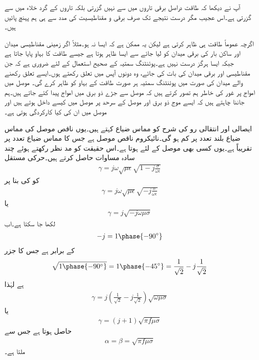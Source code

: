آپ نے دیکھا کہ طاقت دراصل برقی تاروں میں سے نہیں گزرتی بلکہ تاروں کے گرد خلاء میں سے گزرتی ہے۔اس عجیب مگر درست نتیجے تک صرف برقی و مقناطیسیت کی مدد سے ہی ہم پہنچ پائیں ہیں۔ 

اگرچہ  عموماً طاقت ہی ظاہر کرتی ہے لیکن یہ ممکن ہے کہ ایسا نہ ہو۔مثلاً اگر زمینی مقناطیسی میدان  اور ساکن بار کی برقی میدان  کو لیا جائے  سے ایسا ظاہر ہوتا ہے جیسے طاقت کا بہاو پایا جاتا ہے جبکہ ایسا ہرگز درست نہیں ہے۔پوئنٹنگ سمتیہ کے صحیح استعمال کے لئے ضروری ہے کہ جن مقناطیسی اور برقی میدان کی بات کی جائے، وہ دونوں آپس میں تعلق رکھتے ہوں۔ایسے تعلق رکھنے والے میدان کی صورت میں پوئنٹنگ  سمتیہ ہر صورت طاقت کے بہاو کو ظاہر کرے گی۔ 
موصل میں امواج پر غور کی خاطر ہم تصور کرتے ہیں کہ موصل سے جڑے ذو برق میں امواج پیدا کئے جاتے ہیں۔ہم جاننا چاہتے ہیں کہ ایسے موج ذو برق اور موصل کے سرحد پر موصل میں کیسے داخل ہوتے ہیں اور موصل میں ان کی کیا کارکردگی ہوتی ہے۔

ایصالی اور انتقالی رو کی شرح  کو مماس ضیاع کہتے ہیں۔یوں ناقص موصل کی مماس ضیاع بلند تعدد پر کم ہو گی۔نائیکروم ناقص موصل ہے جس کا مماس ضیاع  تعدد پر  تقریباً  ہے۔یوں کسی بھی موصل کے لئے  ہوتا ہے۔اس حقیقت کو مد نظر رکھتے ہوئے چند سادہ مساوات حاصل کرتے ہیں۔حرکی مستقل
\begin{align*}
\gamma=j \omega \sqrt{\mu \epsilon} \sqrt{1-j \frac{\sigma}{\omega \epsilon}}
\end{align*}
کو  کی بنا پر
\begin{align*}
\gamma=j \omega \sqrt{\mu \epsilon}\sqrt{-j \frac{\sigma}{\omega \epsilon}}
\end{align*}
یا
\begin{align*}
\gamma=j \sqrt{-j \omega \mu \sigma}
\end{align*}
لکھا جا سکتا ہے۔اب
\begin{align*}
-j = 1\phase{-90^\circ}
\end{align*}
کے برابر ہے جس کا جزر
\begin{align*}
\sqrt{1\phase{-90^\circ}}=1\phase{-45^\circ}=\frac{1}{\sqrt{2}}-j \frac{1}{\sqrt{2}}
\end{align*}
ہے لہٰذا
\begin{align*}
\gamma=j \left(\frac{1}{\sqrt{2}}-j \frac{1}{\sqrt{2}}\right)\sqrt{\omega \mu \sigma}
\end{align*}
یا
\begin{align}
\gamma=\left(j+1 \right)\sqrt{\pi f \mu \sigma}
\end{align}
حاصل ہوتا ہے جس سے
\begin{align}
\alpha=\beta=\sqrt{\pi f \mu \sigma}
\end{align}
ملتا ہے۔

